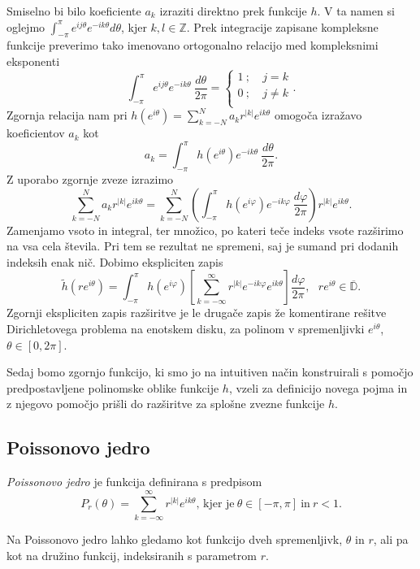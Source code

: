 \documentclass[mat1, tisk]{fmfdelo}
\begin{document}
    Smiselno bi bilo koeficiente $a_k$ izraziti direktno prek funkcije $h$. 
    V ta namen si oglejmo $\int_{-\pi}^{\pi}{e^{ij\theta} e^{-ik\theta}d\theta}$, kjer $k,l \in \mathbb{Z}$. Prek integracije zapisane kompleksne funkcije preverimo tako imenovano ortogonalno relacijo med kompleksnimi eksponenti
        $$
        \int_{-\pi}^{\pi}{e^{ij\theta} e^{-ik\theta}~\frac{d\theta}{2\pi}} = 
        \begin{cases}
            1~;~&j=k\\
            0~;~&j \neq k\\
        \end{cases}
        .$$
    Zgornja relacija nam pri $h(e^{i\theta}) = \sum_{k = -N}^{N}{a_k r^{|k|} e^{ik\theta}}$ omogoča izražavo koeficientov $a_k$ kot
        $$
            a_ k = \int_{-\pi}^{\pi}{h \left(e^{i\theta}\right)e^{-ik\theta}~\frac{d\theta}{2\pi}}.
        $$
    Z uporabo zgornje zveze izrazimo
    $$
        \sum_{k = - N}^{N}{ a_k r^{|k|}e^{ik\theta}} = \sum_{k = - N}^{N} \left(\int_{-\pi}^{\pi}{h(e^{i \varphi}) e^{- i k \varphi}~\frac{d \varphi}{2 \pi}}\right) r^{|k|} e^{i k \theta}.
    $$
    Zamenjamo vsoto in integral, ter množico, po kateri teče indeks vsote razširimo na vsa cela števila. Pri tem se rezultat ne spremeni, saj je sumand pri dodanih indeksih enak nič. Dobimo ekspliciten zapis
    \begin{equation}
        \label{int1}
        \widetilde{h}(r e^{i \theta}) = \int_{-\pi}^{\pi}{h(e^{i \varphi}) \left[\sum_{k = - \infty}^{\infty} r^{|k|} e^{- i k \varphi} e^{i k \theta} \right] \frac{d \varphi}{2 \pi}}, ~~~ r e^{i\theta} \in \overline{\mathbb{D}}.
    \end{equation}
    Zgornji ekspliciten zapis razširitve je le drugače zapis že komentirane rešitve Dirichletovega problema na enotskem disku, za polinom v spremenljivki $e^{i \theta}$, \mbox{$\theta \in [0,2\pi]$}.
    
    Sedaj bomo zgornjo funkcijo, ki smo jo na intuitiven način konstruirali s pomočjo predpostavljene polinomske oblike funkcije $h$, vzeli za definicijo novega pojma in z njegovo pomočjo prišli do razširitve za splošne zvezne funkcije $h$.
    
\subsection{Poissonovo jedro}
    \begin{definicija}
        \emph{Poissonovo jedro} je funkcija definirana s predpisom
        $$
           P_r(\theta) = \sum_{k = -\infty}^{\infty}{r^{|k|} e^{i k \theta}}\text{, kjer je}~\theta \in [-\pi, \pi]~\text{in}~ r < 1.
        $$
    \end{definicija}
    \begin{opomba}
        Na Poissonovo jedro lahko gledamo kot funkcijo dveh spremenljivk, $\theta$ in $r$, ali pa kot na družino funkcij, indeksiranih s parametrom $r$.
    \end{opomba}
\end{document}
